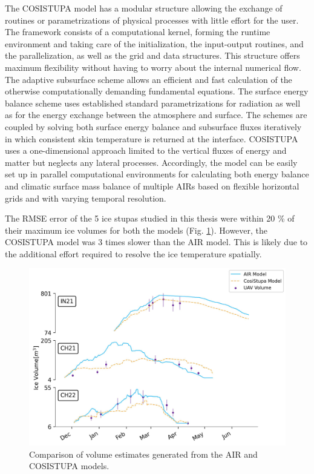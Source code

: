 The COSISTUPA model has a modular structure allowing the exchange of routines or parametrizations of physical
processes with little effort for the user. The framework consists of a computational kernel, forming
the runtime environment and taking care of the initialization, the input-output routines, and the
parallelization, as well as the grid and data structures. This structure offers maximum flexibility without
having to worry about the internal numerical flow. The adaptive subsurface scheme allows an efficient and fast
calculation of the otherwise computationally demanding fundamental equations. The surface energy balance scheme
uses established standard parametrizations for radiation as well as for the energy exchange between the
atmosphere and surface. The schemes are coupled by solving both surface energy balance and subsurface fluxes
iteratively in which consistent skin temperature is returned at the interface. COSISTUPA uses a one-dimensional
approach limited to the vertical fluxes of energy and matter but neglects any lateral processes. Accordingly,
the model can be easily set up in parallel computational environments for calculating both energy balance and
climatic surface mass balance of multiple \ac{AIRs} based on flexible horizontal grids and with varying temporal
resolution.

The RMSE error of the 5 ice stupas studied in this thesis were within 20 \% of their maximum ice volumes for both
the models (Fig. \ref{fig:Cosistupa}).  However, the COSISTUPA model was 3 times slower than the AIR model. This
is likely due to the additional effort required to resolve the ice temperature spatially.

\begin{figure}[t]
	\centering
	\includegraphics[width=\textwidth]{figs/model_compare.jpg}

	\caption{Comparison of volume estimates generated from the AIR and COSISTUPA models.}

	\label{fig:Cosistupa}
\end{figure}

